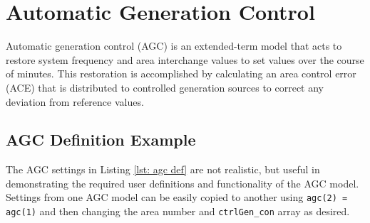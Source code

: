 \pagebreak
\section{Automatic Generation Control}  \label{sec: AGC def}
Automatic generation control (AGC) is an extended-term model that acts to restore system frequency and area interchange values to set values over the course of minutes.
This restoration is accomplished by calculating an area control error (ACE) that is distributed to controlled generation sources to correct any deviation from reference values.






\pagebreak
\subsection{AGC Definition Example}
The AGC settings in Listing \ref{lst: agc def} are not realistic, but useful in demonstrating the required user definitions and functionality of the AGC model.
Settings from one AGC model can be easily copied to another using \verb|agc(2) = agc(1)| and then changing the area number and \verb|ctrlGen_con| array as desired.

